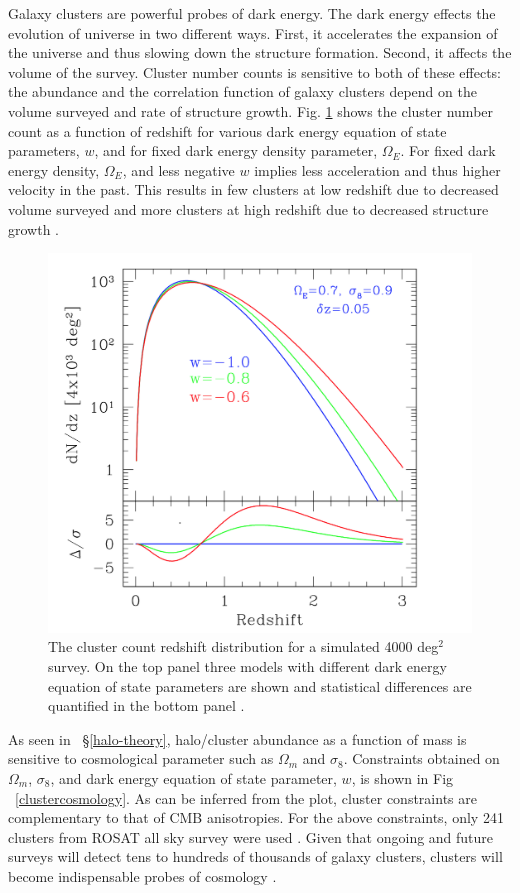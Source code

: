 Galaxy clusters are powerful probes of dark energy. The dark energy effects the evolution of universe in two different ways. 
First, it accelerates the expansion of the universe and thus slowing down the structure formation. Second, it affects the volume of the survey. Cluster number counts is sensitive to both of these effects: the abundance and the correlation function of galaxy clusters depend on the volume surveyed and rate of structure growth. Fig. \ref{de_plot} shows the cluster number count as a function of redshift for various dark energy equation of state parameters, $w$, and for fixed dark energy density parameter, $\Omega_{E}$. For fixed dark energy density, $\Omega_{E}$, and less negative $w$ implies less acceleration and thus higher velocity in the past. 
This results in few clusters at low redshift due to decreased volume surveyed and more clusters at high redshift due to decreased structure growth \citep{mohr03}.
\begin{figure}[H]
\includegraphics[width = \columnwidth]{figs/cluster_de_plot.png}
\caption{The cluster count redshift distribution for a simulated 4000 deg$^{2}$ survey. On the top panel three models with different dark energy equation of state parameters are shown and statistical differences are quantified in the bottom panel \citep{mohr03}. }
\label{de_plot}
\end{figure}


As seen in ~\S\ref{halo-theory}, halo/cluster abundance as a function of mass is sensitive to cosmological parameter such as $\Omega_{m}$ and $\sigma_{8}$. 
Constraints obtained on $\Omega_{m}$, $\sigma_{8}$, and dark energy equation of state parameter, $w$, is shown in Fig ~\ref{clustercosmology}.
As can be inferred from the plot, cluster constraints are complementary to that of CMB anisotropies. For the above constraints, only 241 clusters from ROSAT all sky survey were used \citep{mantz15}. Given that ongoing and future surveys will detect tens to hundreds of thousands of galaxy clusters, clusters will become indispensable probes of cosmology \citep{so18, bender18, lsst09,erosita12,cmbs4-sb1}. %

